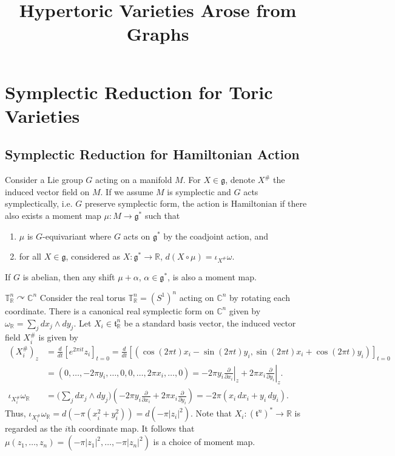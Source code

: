 \documentclass[b5paper]{article}
\title{\bf{
Hypertoric Varieties Arose from Graphs
}}
\newcommand{\acton}{\curvearrowright}
\newcommand{\ind}[1]{#1^\#}
\newcommand{\intd}[1]{\iota_{#1}}
\begin{document}
\maketitle
\vspace{-3.5em}
%

\thispagestyle{empty}
\tableofcontents
\listoftodos

\section{Symplectic Reduction for Toric Varieties}

\subsection{Symplectic Reduction for Hamiltonian Action}

Consider a Lie group $G$ acting on a manifold $M$. For $X\in\mathfrak{g}$, denote $\ind{X}$ the induced vector field on $M$. If we assume $M$ is symplectic and $G$ acts symplectically, i.e. $G$ preserve symplectic form, the action is Hamiltonian if there also exists a moment map $\mu : M \to \mathfrak{g}^*$ such that
\begin{enumerate}
    \item $\mu$ is $G$-equivariant where $G$ acts on $\mathfrak{g}^*$ by the coadjoint action, and
    \item for all $X \in \mathfrak{g}$, considered as $X : \mathfrak{g}^* \to \mathbb{R}$, $d(X \circ \mu) = \intd{\ind{X}}\omega$.
\end{enumerate}
If $G$ is abelian, then any shift $\mu+\alpha$, $\alpha\in\mathfrak{g}^*$, is also a moment map.

\begin{example}{$\mathbb{T}_\mathbb{R}^n \acton \mathbb{C}^n$}
    Consider the real torus $\mathbb{T}_\mathbb{R}^n=(S^1)^n$ acting on $\mathbb{C}^n$ by rotating each coordinate. There is a canonical real symplectic form on $\mathbb{C}^n$ given by $\omega_\mathbb{R}=\sum_jdx_j\wedge dy_j$. Let $X_i\in\mathfrak{t}_\mathbb{R}^n$ be a standard basis vector, 
    the induced vector field $\ind{X_i}$ is given by
    \begin{align*}
        (\ind{X_i})_z &= \frac{d}{dt} [e^{2\pi it} z_i]_{t=0}
        = \frac{d}{dt} [(\cos(2\pi t) x_i - \sin(2\pi t) y_i,\sin(2\pi t)x_i + \cos(2\pi t)y_i)]_{t=0} \\
        &= (0, \dots, -2\pi y_i, \dots, 0, 0, \dots, 2\pi x_i, \dots, 0) = -2\pi y_i \left.\frac{\partial}{\partial x_i}\right|_z + 2\pi x_i \left.\frac{\partial}{\partial y_i}\right|_z.\\
        \intd{\ind{X_i}}\omega_\mathbb{R} &= \biggl(\sum_j dx_j \wedge dy_j\biggr)\left(-2\pi y_i \frac{\partial}{\partial x_i} + 2\pi x_i \frac{\partial}{\partial y_i}\right)
        = -2\pi (x_i \, dx_i + y_i \, dy_i).
    \end{align*}
    Thus, $\intd{\ind{X_i}}\omega_\mathbb{R} = d(-\pi(x_i^2 + y_i^2)) = d(-\pi|z_i|^2)$. Note that $X_i : (\mathfrak{t}^n)^* \to \mathbb{R}$ is regarded as the $i$th coordinate map. It follows that $\mu(z_1, \dots, z_n) = (-\pi|z_1|^2, \dots, -\pi|z_n|^2)$ is a choice of moment map.
\end{example}
\end{document}
